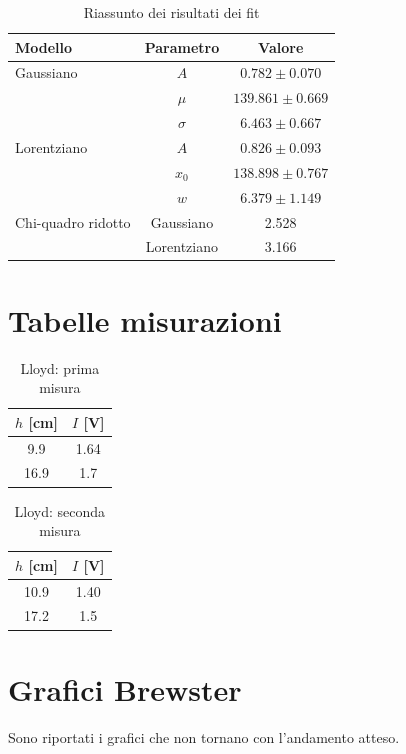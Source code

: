 \documentclass[letterpaper,12pt]{article}
\begin{document}
\begin{table}[h!]
    \centering
    \caption{Riassunto dei risultati dei fit}
    \label{tab:fit_results}
    \begin{tabular}{|l|c|c|}
        \hline
        \textbf{Modello} & \textbf{Parametro} & \textbf{Valore} \\
        \hline
        Gaussiano & $A$ & $0.782 \pm 0.070$ \\
                  & $\mu$ & $139.861 \pm 0.669$ \\
                  & $\sigma$ & $6.463 \pm 0.667$ \\
        \hline
        Lorentziano & $A$ & $0.826 \pm 0.093$ \\
                    & $x_0$ & $138.898 \pm 0.767$ \\
                    & $w$ & $6.379 \pm 1.149$ \\
        \hline
        Chi-quadro ridotto & Gaussiano & 2.528 \\
                            & Lorentziano & 3.166 \\
        \hline
    \end{tabular}
\end{table}
\newpage
\section{Tabelle misurazioni}

\begin{table}[h!]
	\centering
	\caption{Lloyd: prima misura}
	\label{tab:lloyd1}
	\begin{tabular}{|c|c|}
		\hline
		$h$ [cm] & $I$ [V] \\
		\hline
		9.9      & 1.64    \\
		16.9     & 1.7     \\
		\hline
	\end{tabular}
\end{table}

\begin{table}[h!]
	\centering
	\caption{Lloyd: seconda misura}
	\label{tab:lloyd2}
	\begin{tabular}{|c|c|}
		\hline
		$h$ [cm] & $I$ [V] \\
		\hline
		10.9     & 1.40    \\
		17.2     & 1.5     \\
		\hline
	\end{tabular}
\end{table}

\newpage
\section{Grafici Brewster}
Sono riportati i grafici che non tornano con l'andamento atteso.
\end{document}
